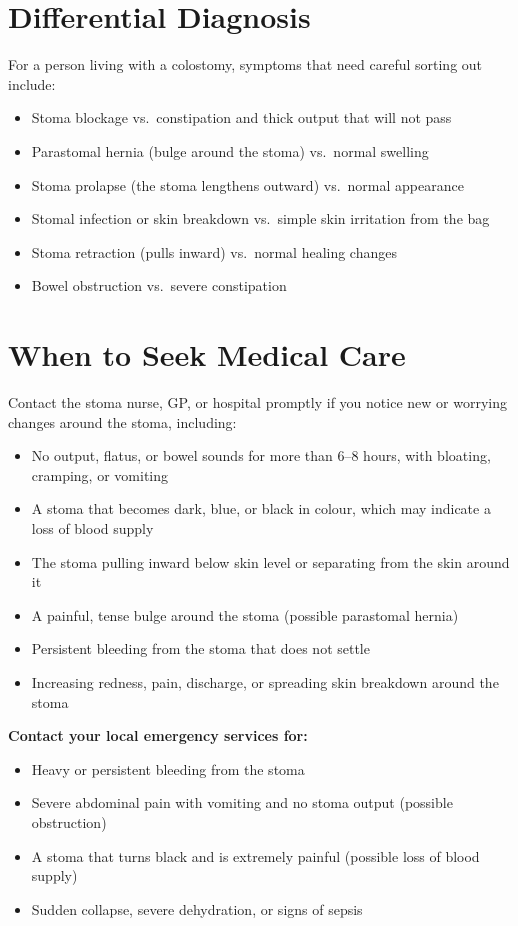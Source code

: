 \section*{Differential Diagnosis}
For a person living with a colostomy, symptoms that need careful sorting out include:

\begin{itemize}
    \item Stoma blockage vs.\ constipation and thick output that will not pass
    \item Parastomal hernia (bulge around the stoma) vs.\ normal swelling
    \item Stoma prolapse (the stoma lengthens outward) vs.\ normal appearance
    \item Stomal infection or skin breakdown vs.\ simple skin irritation from the bag
    \item Stoma retraction (pulls inward) vs.\ normal healing changes
    \item Bowel obstruction vs.\ severe constipation
\end{itemize}

\section*{When to Seek Medical Care}
Contact the stoma nurse, GP, or hospital promptly if you notice new or worrying changes around the stoma, including:

\begin{itemize}
    \item No output, flatus, or bowel sounds for more than 6--8 hours, with bloating, cramping, or vomiting
    \item A stoma that becomes dark, blue, or black in colour, which may indicate a loss of blood supply
    \item The stoma pulling inward below skin level or separating from the skin around it
    \item A painful, tense bulge around the stoma (possible parastomal hernia)
    \item Persistent bleeding from the stoma that does not settle
    \item Increasing redness, pain, discharge, or spreading skin breakdown around the stoma
\end{itemize}

\textbf{Contact your local emergency services for:}
\begin{itemize}
    \item Heavy or persistent bleeding from the stoma
    \item Severe abdominal pain with vomiting and no stoma output (possible obstruction)
    \item A stoma that turns black and is extremely painful (possible loss of blood supply)
    \item Sudden collapse, severe dehydration, or signs of sepsis
\end{itemize}

